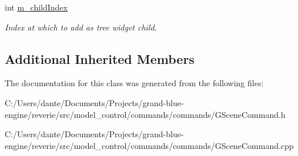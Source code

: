 \begin{Indent}
\begin{DoxyCompactItemize}
\mbox{\label{classrev_1_1_copy_scene_object_command_a99368e6b33f998b3a8b13297470f7242}} 
int \mbox{\hyperlink{classrev_1_1_copy_scene_object_command_a99368e6b33f998b3a8b13297470f7242}{m\+\_\+child\+Index}}
\begin{DoxyCompactList}\small\item\em Index at which to add as tree widget child. \end{DoxyCompactList}\end{DoxyCompactItemize}
\end{Indent}
\subsection*{Additional Inherited Members}


The documentation for this class was generated from the following files\+:\begin{DoxyCompactItemize}
\item 
C\+:/\+Users/dante/\+Documents/\+Projects/grand-\/blue-\/engine/reverie/src/model\+\_\+control/commands/commands/G\+Scene\+Command.\+h\item 
C\+:/\+Users/dante/\+Documents/\+Projects/grand-\/blue-\/engine/reverie/src/model\+\_\+control/commands/commands/G\+Scene\+Command.\+cpp\end{DoxyCompactItemize}
